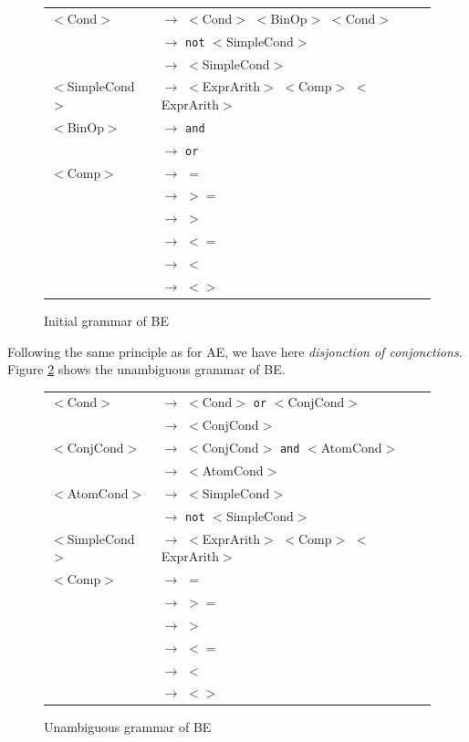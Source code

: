 \documentclass[letterpaper]{article}
\begin{document}
\begin{figure}[H]
    \centering
    \begin{tabular}{l l}
        $<$Cond$>$ & $\rightarrow$ $<$Cond$>$ $<$BinOp$>$ $<$Cond$>$ \\
         & $\rightarrow$ \texttt{not} $<$SimpleCond$>$\\
         & $\rightarrow$ $<$SimpleCond$>$\\
        $<$SimpleCond$>$ & $\rightarrow$
        $<$ExprArith$>$ $<$Comp$>$ $<$ExprArith$>$ \\
        $<$BinOp$>$ & $\rightarrow$ \texttt{and}\\
         & $\rightarrow$ \texttt{or}\\
        $<$Comp$>$ & $\rightarrow$ $=$\\
         & $\rightarrow$ $>=$\\
         & $\rightarrow$ $>$\\
         & $\rightarrow$ $<=$\\
         & $\rightarrow$ $<$\\
         & $\rightarrow$ $<>$\\
    \end{tabular}
    \caption{Initial grammar of BE}
    \label{fig:BE-initial}

\end{figure}

Following the same principle as for AE, we have here
\textit{disjonction of conjonctions}. Figure \ref{fig:BE-unambi}
shows the unambiguous grammar of BE.


\begin{figure}[H]
    \centering
    \begin{tabular}{l l}
        $<$Cond$>$ & $\rightarrow$ $<$Cond$>$ \texttt{or} $<$ConjCond$>$ \\
         & $\rightarrow$ $<$ConjCond$>$\\

        $<$ConjCond$>$ & $\rightarrow$
        $<$ConjCond$>$ \texttt{and} $<$AtomCond$>$\\
         & $\rightarrow$ $<$AtomCond$>$\\

        $<$AtomCond$>$ & $\rightarrow$ $<$SimpleCond$>$\\
         & $\rightarrow$ \texttt{not} $<$SimpleCond$>$\\

        $<$SimpleCond$>$ & $\rightarrow$
        $<$ExprArith$>$ $<$Comp$>$ $<$ExprArith$>$\\

        $<$Comp$>$ & $\rightarrow$ $=$\\
         & $\rightarrow$ $>=$\\
         & $\rightarrow$ $>$\\
         & $\rightarrow$ $<=$\\
         & $\rightarrow$ $<$\\
         & $\rightarrow$ $<>$\\
    \end{tabular}
    \caption{Unambiguous grammar of BE}
    \label{fig:BE-unambi}

\end{figure}
\end{document}
